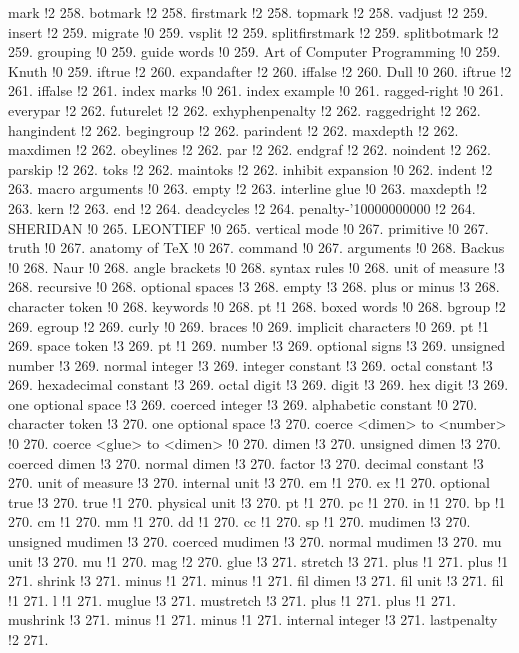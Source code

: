 mark !2 258.
botmark !2 258.
firstmark !2 258.
topmark !2 258.
vadjust !2 259.
insert !2 259.
migrate !0 259.
vsplit !2 259.
splitfirstmark !2 259.
splitbotmark !2 259.
grouping !0 259.
guide words !0 259.
Art of Computer Programming !0 259.
Knuth !0 259.
iftrue !2 260.
expandafter !2 260.
iffalse !2 260.
Dull !0 260.
iftrue !2 261.
iffalse !2 261.
index marks !0 261.
index example !0 261.
ragged-right !0 261.
everypar !2 262.
futurelet !2 262.
exhyphenpenalty !2 262.
raggedright !2 262.
hangindent !2 262.
begingroup !2 262.
parindent !2 262.
maxdepth !2 262.
maxdimen !2 262.
obeylines !2 262.
par !2 262.
endgraf !2 262.
noindent !2 262.
parskip !2 262.
toks !2 262.
maintoks !2 262.
inhibit expansion !0 262.
indent !2 263.
macro arguments !0 263.
empty !2 263.
interline glue !0 263.
maxdepth !2 263.
kern !2 263.
end !2 264.
deadcycles !2 264.
penalty-'10000000000 !2 264.
SHERIDAN !0 265.
LEONTIEF !0 265.
vertical mode !0 267.
primitive !0 267.
truth !0 267.
anatomy of TeX !0 267.
command !0 267.
arguments !0 268.
Backus !0 268.
Naur !0 268.
angle brackets !0 268.
syntax rules !0 268.
unit of measure !3 268.
recursive !0 268.
optional spaces !3 268.
empty !3 268.
plus or minus !3 268.
character token !0 268.
keywords !0 268.
pt !1 268.
boxed words !0 268.
bgroup !2 269.
egroup !2 269.
curly !0 269.
braces !0 269.
implicit characters !0 269.
pt !1 269.
space token !3 269.
pt !1 269.
number !3 269.
optional signs !3 269.
unsigned number !3 269.
normal integer !3 269.
integer constant !3 269.
octal constant !3 269.
hexadecimal constant !3 269.
octal digit !3 269.
digit !3 269.
hex digit !3 269.
one optional space !3 269.
coerced integer !3 269.
alphabetic constant !0 270.
character token !3 270.
one optional space !3 270.
coerce <dimen> to <number> !0 270.
coerce <glue> to <dimen> !0 270.
dimen !3 270.
unsigned dimen !3 270.
coerced dimen !3 270.
normal dimen !3 270.
factor !3 270.
decimal constant !3 270.
unit of measure !3 270.
internal unit !3 270.
em !1 270.
ex !1 270.
optional {\fam \ttfam \ninett true} !3 270.
true !1 270.
physical unit !3 270.
pt !1 270.
pc !1 270.
in !1 270.
bp !1 270.
cm !1 270.
mm !1 270.
dd !1 270.
cc !1 270.
sp !1 270.
mudimen !3 270.
unsigned mudimen !3 270.
coerced mudimen !3 270.
normal mudimen !3 270.
mu unit !3 270.
mu !1 270.
mag !2 270.
glue !3 271.
stretch !3 271.
plus !1 271.
plus !1 271.
shrink !3 271.
minus !1 271.
minus !1 271.
fil dimen !3 271.
fil unit !3 271.
fil !1 271.
l !1 271.
muglue !3 271.
mustretch !3 271.
plus !1 271.
plus !1 271.
mushrink !3 271.
minus !1 271.
minus !1 271.
internal integer !3 271.
lastpenalty !2 271.
